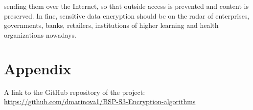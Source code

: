 sending them over the Internet, so that outside access is prevented and content is preserved. In fine, sensitive data encryption should be on the radar of enterprises, governments, banks, retailers, institutions of higher learning and health organizations nowadays.


\newpage 
\section{Appendix}


A link to the GitHub repository of the project: \url{https://github.com/dmarinova1/BSP-S3-Encryption-algorithms}
